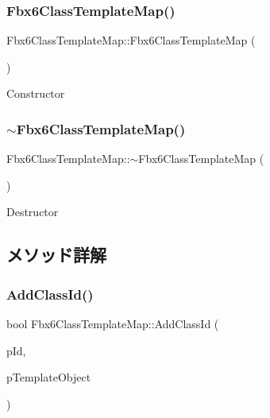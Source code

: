 \subsubsection{\texorpdfstring{Fbx6\+Class\+Template\+Map()}{Fbx6ClassTemplateMap()}}
{\footnotesize\ttfamily Fbx6\+Class\+Template\+Map\+::\+Fbx6\+Class\+Template\+Map (\begin{DoxyParamCaption}{ }\end{DoxyParamCaption})}

Constructor \mbox{\label{class_fbx6_class_template_map_af1b623f6de8fefd4c4515a66e40a2bec}} 
\subsubsection{\texorpdfstring{$\sim$\+Fbx6\+Class\+Template\+Map()}{~Fbx6ClassTemplateMap()}}
{\footnotesize\ttfamily Fbx6\+Class\+Template\+Map\+::$\sim$\+Fbx6\+Class\+Template\+Map (\begin{DoxyParamCaption}{ }\end{DoxyParamCaption})}

Destructor 

\subsection{メソッド詳解}
\mbox{\label{class_fbx6_class_template_map_a064f7a5f731932c34a257fe9947c3981}} 
\subsubsection{\texorpdfstring{Add\+Class\+Id()}{AddClassId()}}
{\footnotesize\ttfamily bool Fbx6\+Class\+Template\+Map\+::\+Add\+Class\+Id (\begin{DoxyParamCaption}\item[{\hyperlink{class_fbx_class_id}{Fbx\+Class\+Id}}]{p\+Id,  }\item[{\hyperlink{class_fbx_object}{Fbx\+Object} $\ast$}]{p\+Template\+Object }\end{DoxyParamCaption})}


